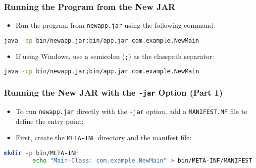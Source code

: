 \documentclass[aspectratio=169, table]{beamer}
\begin{document}
\begin{frame}[fragile]
	\frametitle{Running the Program from the New JAR}
	\begin{itemize}
		\item Run the program from \texttt{newapp.jar} using the following command:
	\end{itemize}
	\begin{lstlisting}[language=bash]
		java -cp bin/newapp.jar:bin/app.jar com.example.NewMain
	\end{lstlisting}
	\begin{itemize}
		\item If using Windows, use a semicolon (\texttt{;}) as the classpath separator:
	\end{itemize}
	\begin{lstlisting}[language=bash]
		java -cp bin/newapp.jar;bin/app.jar com.example.NewMain
	\end{lstlisting}
\end{frame}


\begin{frame}[fragile]
	\frametitle{\LARGE{Running the New JAR with the \texttt{-jar} Option (Part 1)}}
	\begin{itemize}
		\item To run \texttt{newapp.jar} directly with the \texttt{-jar} option, add a \texttt{MANIFEST.MF} file to define the entry point:
		\item First, create the \texttt{META-INF} directory and the manifest file:
	\end{itemize}
	\begin{lstlisting}[language=bash]
		mkdir -p bin/META-INF
		echo "Main-Class: com.example.NewMain" > bin/META-INF/MANIFEST.MF
	\end{lstlisting}
\end{frame}
\end{document}
